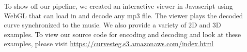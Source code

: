\documentclass[runningheads]{llncs}
\begin{document}
To show off our pipeline, we created an interactive viewer in Javascript using WebGL that can load in and decode any mp3 file.  The viewer plays the decoded curve synchronized to the music.  We also provide a variety of 2D and 3D examples.  To view our source code for encoding and decoding and look at these examples, please visit \url{https://curvesteg.s3.amazonaws.com/index.html}



%
%
%


%
\end{document}
